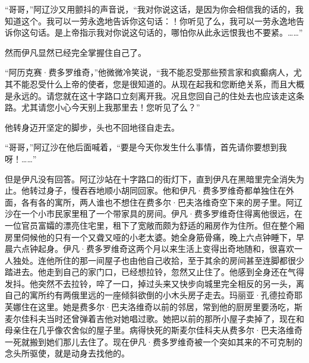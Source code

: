 \par “哥哥，”阿辽沙又用颤抖的声音说，“我对你说这话，是因为你会相信我的话的，我知道这个。我可以一劳永逸地告诉你这句话：！你听见了么，我可以一劳永逸地告诉你这句话。是上帝指示我对你说这句话的，哪怕你从此永远恨我也不要紧。……”
\par 然而伊凡显然已经完全掌握住自己了。
\par “阿历克赛·费多罗维奇，”他微微冷笑说，“我不能忍受那些预言家和疯癫病人，尤其不能忍受什么上帝的使者，您是很知道的。从现在起我和您断绝关系，而且大概是永远的。请您就在这十字路口立刻离开我。况且您回自己的住处去也应该走这条路。尤其请您小心今天别上我那里去！您听见了么？”
\par 他转身迈开坚定的脚步，头也不回地径自走去。
\par “哥哥，”阿辽沙在他后面喊着，“要是今天你发生什么事情，首先请你要想到我呀！……”
\par 但是伊凡没有回答。阿辽沙站在十字路口的街灯下，直到伊凡在黑暗里完全消失为止。他转过身子，慢吞吞地顺小胡同回家。他和伊凡·费多罗维奇都单独住在外面，各有各的寓所，两人谁也不想住在费多尔·巴夫洛维奇空下来的房子里。阿辽沙在一个小市民家里租了一个带家具的房间。伊凡·费多罗维奇住得离他很远，在一位官员富孀的漂亮住宅里，租下了宽敞而颇为舒适的厢房作为住所。但在整个厢房里伺候他的只有一个又聋又哑的小老太婆。她全身筋骨痛，晚上六点钟睡下，早晨六点钟起身。伊凡·费多罗维奇这两个月以来生活上变得出奇地随和，很喜欢一人独处。连他所住的那一间屋子也由他自己收拾，至于其余的房间甚至连脚都很少踏进去。他走到自己的家门口，已经想拉铃，忽然又止住了。他感到全身还在气得发抖。他突然不去拉铃，啐了一口，掉过头来又快步向城里完全相反的另一头，离自己的寓所约有两俄里远的一座倾斜欲倒的小木头房子走去。玛丽亚·孔德拉奇耶芙娜住在这里。她是费多尔·巴夫洛维奇以前的邻居，常到他的厨房里要汤吃，斯麦尔佳科夫当时还曾弹着吉他对她唱过歌。她把以前的那所小屋子卖掉了，现在和母亲住在几乎像农舍似的屋子里。病得快死的斯麦尔佳科夫从费多尔·巴夫洛维奇一死就搬到她们那儿去住了。现在伊凡·费多罗维奇被一个突如其来的不可克制的念头所驱使，就是动身去找他的。
